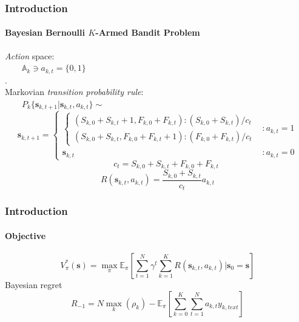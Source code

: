 \documentclass[12pt, aspectratio=169, mathserif]{beamer}
\begin{document}
  \begin{frame}[t]
    \frametitle{Introduction}
    \framesubtitle{Bayesian Bernoulli $K$-Armed Bandit Problem}
    \textit{Action} space:\\
    $\qquad\mathbb{A}_k \ni a_{k,t} = \{0 , 1\}$\\
    \color{white}.\color{black}\\
    Markovian \textit{transition probability rule}:\\
    $\qquad P_k\{\mathbf{s}_{k, t + 1} | \mathbf{s}_{k, t}, a_{k, t}\}\sim$
    \begin{equation*}
      \mathbf{s}_{k, t + 1} = \left\{\begin{matrix}
        \left\{\begin{array}{c}
          (S_{k, 0} + S_{k, t} + 1, F_{k, 0} + F_{k, t}): (S_{k, 0} + S_{k, t})/c_t\\
          (S_{k, 0} + S_{k, t}, F_{k, 0} + F_{k, t} + 1): (F_{k, 0} + F_{k, t})/c_t
        \end{array}\right.&:a_{k,t} = 1\\
        \mathbf{s}_{k, t} &: a_{k, t} = 0
      \end{matrix}\right.
    \end{equation*}
    \begin{equation*}
      \qquad c_t = S_{k, 0} + S_{k, t} + F_{k, 0} + F_{k, t}
    \end{equation*}
    \begin{equation*}
      R(\mathbf{s}_{k, t}, a_{k, t}) = \frac{S_{k, 0} + S_{k, t}}{c_t}a_{k, t}
    \end{equation*}
  \end{frame}
  \begin{frame}[t]
    \frametitle{Introduction}
    \framesubtitle{Objective}
    \begin{equation*}
      V^*_\pi(\mathbf{s}) = \max_\pi\mathbb{E}_\pi\left[\sum_{t = 1}^N\gamma^t
      \sum_{k = 1}^KR(\mathbf{s}_{k,t}, a_{k,t})|\mathbf{s}_0 = \mathbf{s}\right]
    \end{equation*}
    Bayesian regret
    \begin{equation*}
      R_{-1} = N\max_k(\rho_k) - \mathbb{E}_\pi\left[\sum_{k = 0}^K\sum_{t = 1}^Na_{k,t}y_{k,text}\right]
    \end{equation*}
  \end{frame}
\end{document}
